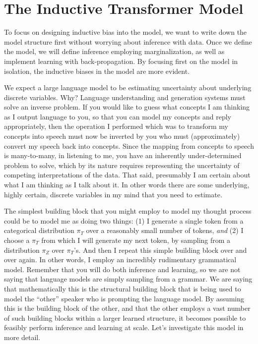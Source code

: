 \documentclass{article}
\begin{document}
\section{The Inductive Transformer Model}\label{section:inductive-transformer-model}

To focus on designing inductive bias into the model, we want to write down the model structure first without worrying about inference with data.  Once we define the model, we will define inference employing marginalization, as well as implement learning with back-propagation.  By focusing first on the model in isolation, the inductive biases in the model are more evident.

We expect a large language model to be estimating uncertainty about underlying discrete variables.  Why? Language understanding and generation systems must solve an inverse problem.  If you would like to guess what concepts I am thinking as I output language to you, so that you can model my concepts and reply appropriately, then the operation I performed which was to transform my concepts into speech must now be inverted by you who must (approximately) convert my speech back into concepts.  Since the mapping from concepts to speech is many-to-many, in listening to me, you have an inherently under-determined problem to solve, which by its nature requires representing the uncertainty of competing interpretations of the data.  That said, presumably I am certain about what I am thinking as I talk about it. In other words there are some underlying, highly certain, discrete variables in my mind that you need to estimate.  

The simplest building block that you might employ to model my thought process could be to model me as doing two things: (1) I generate a single token from a categorical distribution $\pi_T$ over a reasonably small number of tokens, \emph{and} (2) I choose a $\pi_T$ from which I will generate my next token, by sampling from a distribution $\pi_Z$ over $\pi_T$'s.  And then I repeat this simple building block over and over again.  In other words, I employ an incredibly rudimentary grammatical model.  Remember that you will do both inference and learning, so we are not saying that language models are simply sampling from a grammar.  We are saying that mathematically this is the structural building block that is being used to model the ``other'' speaker who is prompting the language model. By assuming this is the building block of the other, and that the other employs a vast number of such building blocks within a larger learned structure, it becomes possible to feasibly perform inference and learning at scale.   Let's investigate this model in more detail.
\end{document}
